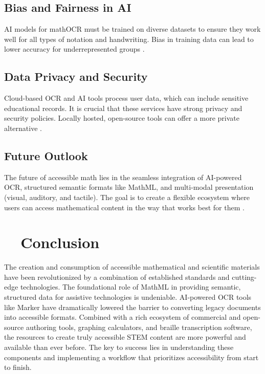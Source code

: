 \subsection{Bias and Fairness in AI}\label{ch11:ssec:bias}
\gls{AI} models for \gls{mathOCR} must be trained on diverse datasets to ensure they work well for all types of notation and handwriting. Bias in training data can lead to lower accuracy for underrepresented groups \supercite{AIEthicsBias, BiasinAI}.

\subsection{Data Privacy and Security}\label{ch11:ssec:privacy}
Cloud-based \gls{OCR} and \gls{AI} tools process user data, which can include sensitive educational records. It is crucial that these services have strong privacy and security policies. Locally hosted, open-source tools can offer a more private alternative \supercite{DataPrivacyAI}.

\subsection{Future Outlook}\label{ch11:ssec:future}
The future of accessible math lies in the seamless integration of \gls{AI}-powered \gls{OCR}, structured semantic formats like \gls{MathML}, and multi-modal presentation (visual, auditory, and tactile). The goal is to create a flexible ecosystem where users can access mathematical content in the way that works best for them \supercite{Kim2023, W3CEmergingTechA11y}.

\section{~~Conclusion}\label{ch11:sec:conclusion}
The creation and consumption of accessible mathematical and scientific materials have been revolutionized by a combination of established standards and cutting-edge technologies. The foundational role of \gls{MathML} in providing semantic, structured data for assistive technologies is undeniable. \gls{AI}-powered \gls{OCR} tools like Marker have dramatically lowered the barrier to converting legacy documents into accessible formats. Combined with a rich ecosystem of commercial and open-source authoring tools, graphing calculators, and braille transcription software, the resources to create truly accessible STEM content are more powerful and available than ever before. The key to success lies in understanding these components and implementing a workflow that prioritizes accessibility from start to finish.
